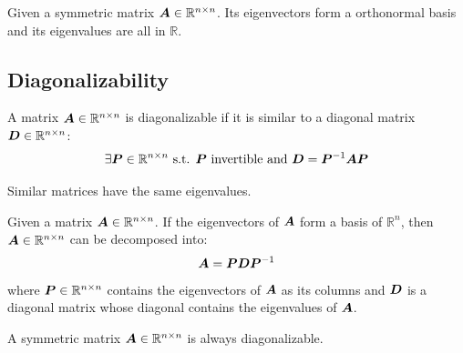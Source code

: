 \begin{theorem} 
    Given a symmetric matrix ${\bm{A}} \in \mathbb{R}^{n \times n}$.
    Its eigenvectors form a orthonormal basis and its eigenvalues are all in $\mathbb{R}$.
\end{theorem}


\subsection{Diagonalizability}
A matrix ${\bm{A}} \in \mathbb{R}^{n \times n}$ is diagonalizable if it is similar to a diagonal matrix ${\bm{D}} \in \mathbb{R}^{n \times n}$:
\[ \exists {\bm{P}} \in \mathbb{R}^{n \times n} \text{ s.t. } {\bm{P}} \text{ invertible and } {\bm{D}} = {\bm{P}}^{-1}{\bm{A}}{\bm{P}} \]

\begin{theorem}
    Similar matrices have the same eigenvalues.
\end{theorem}

\begin{theorem}[Eigendecomposition] 
    Given a matrix ${\bm{A}} \in \mathbb{R}^{n \times n}$.
    If the eigenvectors of ${\bm{A}}$ form a basis of $\mathbb{R}^n$,
    then ${\bm{A}} \in \mathbb{R}^{n \times n}$ can be decomposed into:
    \[ {\bm{A}} = {\bm{P}}{\bm{D}}{\bm{P}}^{-1} \]
    where ${\bm{P}} \in \mathbb{R}^{n \times n}$ contains the eigenvectors of ${\bm{A}}$ as its columns and 
    ${\bm{D}}$ is a diagonal matrix whose diagonal contains the eigenvalues of ${\bm{A}}$.
\end{theorem}

\begin{theorem} 
    A symmetric matrix ${\bm{A}} \in \mathbb{R}^{n \times n}$ is always diagonalizable.
\end{theorem}